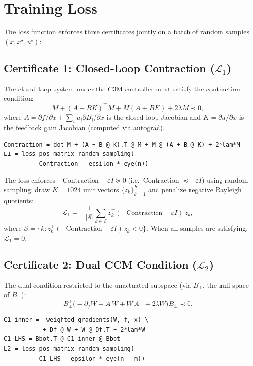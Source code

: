 \documentclass[11pt,a4paper]{article}
\begin{document}
\section{Training Loss}
\label{sec:c3m_loss}

The loss function enforces three certificates jointly on a batch of random samples \((x, x^\star, u^\star)\):

\subsection{Certificate 1: Closed-Loop Contraction (\texorpdfstring{$\mathcal{L}_1$}{L1})}

The closed-loop system under the C3M controller must satisfy the contraction condition:
\[
\dot M + (A + BK)^\top M + M(A + BK) + 2\lambda M \prec 0,
\]
where \(A = \partial f / \partial x + \sum_i u_i \partial B_i / \partial x\) is the closed-loop Jacobian and \(K = \partial u / \partial x\) is the feedback gain Jacobian (computed via autograd).

\begin{lstlisting}[style=python]
Contraction = dot_M + (A + B @ K).T @ M + M @ (A + B @ K) + 2*lam*M
L1 = loss_pos_matrix_random_sampling(
         -Contraction - epsilon * eye(n))
\end{lstlisting}

\begin{codemath}
The loss enforces \(-\text{Contraction} - \varepsilon I \succeq 0\) (i.e.\ Contraction \(\preceq -\varepsilon I\)) using random sampling: draw \(K = 1024\) unit vectors \(\{z_k\}_{k=1}^K\) and penalize negative Rayleigh quotients:
\[
\mathcal{L}_1 = -\frac{1}{|\mathcal{S}|}\sum_{k \in \mathcal{S}} z_k^\top(-\text{Contraction} - \varepsilon I)\,z_k,
\]
where \(\mathcal{S} = \{k : z_k^\top(-\text{Contraction}-\varepsilon I)\,z_k < 0\}\). When all samples are satisfying, \(\mathcal{L}_1 = 0\).
\end{codemath}

\subsection{Certificate 2: Dual CCM Condition (\texorpdfstring{$\mathcal{L}_2$}{L2})}

The dual condition restricted to the unactuated subspace (via \(B_{\bot}\), the null space of \(B^\top\)):
\[
B_{\bot}^\top \bigl( -\partial_f W + A\,W + W\,A^\top + 2\lambda W \bigr) B_{\bot} \prec 0.
\]

\begin{lstlisting}[style=python]
C1_inner = -weighted_gradients(W, f, x) \
           + Df @ W + W @ Df.T + 2*lam*W
C1_LHS = Bbot.T @ C1_inner @ Bbot
L2 = loss_pos_matrix_random_sampling(
         -C1_LHS - epsilon * eye(n - m))
\end{lstlisting}
\end{document}
